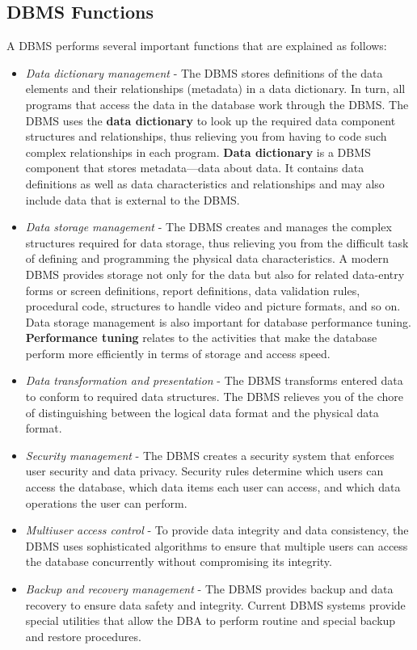 \documentclass[a4paper, 12pt, titlepage]{report}
\begin{document}
\subsection{DBMS Functions}
A DBMS performs several important functions that are explained as follows:
\begin{itemize}
\item \emph{Data dictionary management} - The DBMS stores definitions of the data elements and their relationships (metadata) in a data dictionary. In turn, all programs that access
the data in the database work through the DBMS. The DBMS uses the \textbf{data dictionary} to look up the required data component structures and relationships, thus
relieving you from having to code such complex relationships in each program. \textbf{Data dictionary} is a DBMS component that stores metadata—data about data. It contains data definitions as well as data characteristics and relationships and may also include data that is external to the DBMS.
\item \emph{Data storage management} - The DBMS creates and manages the complex structures required for data storage, thus relieving you from the difficult task of defining and programming the physical data characteristics. A modern DBMS provides storage not only for the data but also for related data-entry forms or screen definitions, report definitions, data validation rules, procedural code, structures to handle video and picture formats, and so on. Data storage management is also important for database performance tuning. \textbf{Performance tuning} relates to the activities that make the database perform more efficiently in terms of storage and access speed.
\item \emph{Data transformation and presentation} - The DBMS transforms entered data to conform to required data structures. The DBMS relieves you of the chore of distinguishing between the logical data format and the physical data format.
\item \emph{Security management} - The DBMS creates a security system that enforces user security and data privacy. Security rules determine which users can access the database, which data items each user can access, and which data operations the user can perform.
\item \emph{Multiuser access control} - To provide data integrity and data consistency, the DBMS uses sophisticated algorithms to ensure that multiple users can access the database
concurrently without compromising its integrity.
\item \emph{Backup and recovery management} - The DBMS provides backup and data recovery to ensure data safety and integrity. Current DBMS systems provide special utilities that allow the DBA to perform routine and special backup and restore procedures.

\end{itemize}
\end{document}
